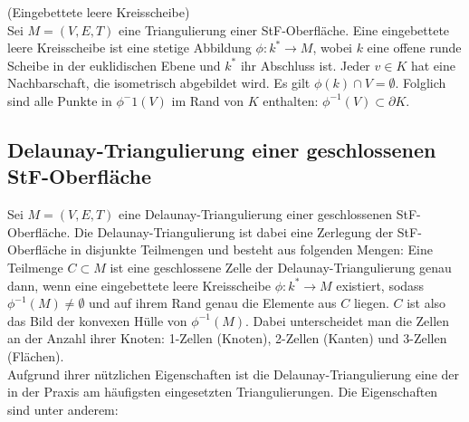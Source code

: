 \begin{definition}(Eingebettete leere Kreisscheibe)\\
Sei $M = (V,E,T)$ eine Triangulierung einer StF-Oberfläche.
Eine eingebettete leere Kreisscheibe ist eine stetige Abbildung $\phi: k^{\ast} \rightarrow M$, wobei $k$ eine offene runde Scheibe in der euklidischen Ebene und  $k^{\ast}$ ihr Abschluss ist.
Jeder $v \in K$ hat eine Nachbarschaft, die isometrisch abgebildet wird. Es gilt $\phi (k) \cap V = \emptyset $. Folglich sind alle Punkte in $\phi^-1(V)$ im Rand von $K$ enthalten: $\phi^{-1}(V) \subset \partial K $. 
\end{definition} 
 
 
 

\subsection*{Delaunay-Triangulierung einer geschlossenen StF-Oberfläche}
Sei $M = (V,E,T)$ eine Delaunay-Triangulierung einer geschlossenen StF-Oberfläche.
Die Delaunay-Triangulierung ist dabei eine Zerlegung der StF-Oberfläche in disjunkte Teilmengen und besteht aus folgenden Mengen: Eine Teilmenge $ C \subset M$ ist eine geschlossene Zelle der Delaunay-Triangulierung genau dann, wenn eine eingebettete leere Kreisscheibe $\phi: k^{\ast} \rightarrow M$ existiert, sodass $\phi^{-1}(M) \not = \emptyset$ und auf ihrem Rand genau die Elemente aus $C$ liegen. 
$C$ ist also das Bild der konvexen Hülle von $\phi^{-1}(M)$.
Dabei unterscheidet man die Zellen an der Anzahl ihrer Knoten: 1-Zellen (Knoten), 2-Zellen (Kanten) und 3-Zellen (Flächen).\\   

Aufgrund ihrer nützlichen Eigenschaften ist die  Delaunay-Triangulierung  eine der in der Praxis am häufigsten eingesetzten Triangulierungen. 
Die Eigenschaften sind unter anderem:

